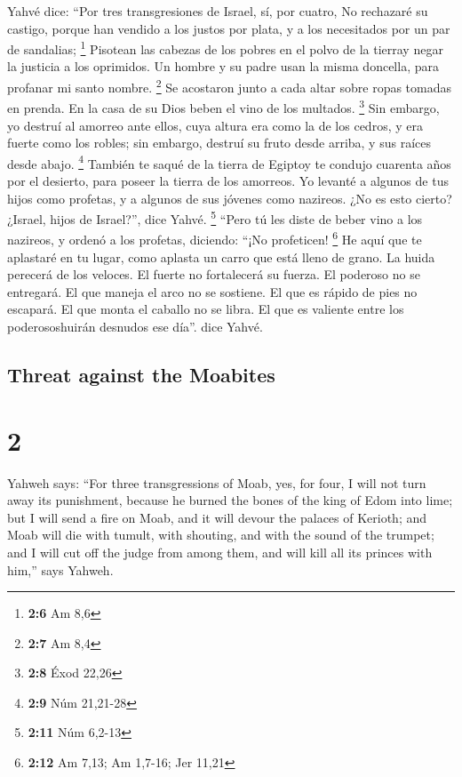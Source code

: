 \begin{paracol}{2}
 Yahvé dice: ``Por tres transgresiones de Israel, sí, por
cuatro, No rechazaré su castigo, porque han vendido a los justos por
plata, y a los necesitados por un par de sandalias; \footnote{\textbf{2:6}
  Am 8,6}  Pisotean las cabezas de los pobres en el polvo
de la tierray negar la justicia a los oprimidos. Un hombre y su padre
usan la misma doncella, para profanar mi santo nombre. \footnote{\textbf{2:7}
  Am 8,4}  Se acostaron junto a cada altar sobre ropas
tomadas en prenda. En la casa de su Dios beben el vino de los multados.
\footnote{\textbf{2:8} Éxod 22,26}  Sin embargo, yo
destruí al amorreo ante ellos, cuya altura era como la de los cedros, y
era fuerte como los robles; sin embargo, destruí su fruto desde arriba,
y sus raíces desde abajo. \footnote{\textbf{2:9} Núm 21,21-28}
 También te saqué de la tierra de Egiptoy te condujo
cuarenta años por el desierto, para poseer la tierra de los amorreos.
 Yo levanté a algunos de tus hijos como profetas, y a
algunos de sus jóvenes como nazireos. ¿No es esto cierto? ¿Israel, hijos
de Israel?'', dice Yahvé. \footnote{\textbf{2:11} Núm 6,2-13}
 ``Pero tú les diste de beber vino a los nazireos, y
ordenó a los profetas, diciendo: ``¡No profeticen! \footnote{\textbf{2:12}
  Am 7,13; Am 1,7-16; Jer 11,21}  He aquí que te
aplastaré en tu lugar, como aplasta un carro que está lleno de grano.
 La huida perecerá de los veloces. El fuerte no
fortalecerá su fuerza. El poderoso no se entregará.  El
que maneja el arco no se sostiene. El que es rápido de pies no escapará.
El que monta el caballo no se libra.  El que es valiente
entre los poderososhuirán desnudos ese día''. dice Yahvé.

\switchcolumn
\begin{otherlanguage}{english}

\hypertarget{threat-against-the-moabites}{%
\subsection{Threat against the
Moabites}\label{threat-against-the-moabites}}

\hypertarget{section-3}{%
\section{2}\label{section-3}}

 Yahweh says: ``For three transgressions of Moab, yes, for
four, I will not turn away its punishment, because he burned the bones
of the king of Edom into lime;  but I will send a fire on
Moab, and it will devour the palaces of Kerioth; and Moab will die with
tumult, with shouting, and with the sound of the trumpet; 
and I will cut off the judge from among them, and will kill all its
princes with him,'' says Yahweh.


\end{otherlanguage}
\end{paracol}
